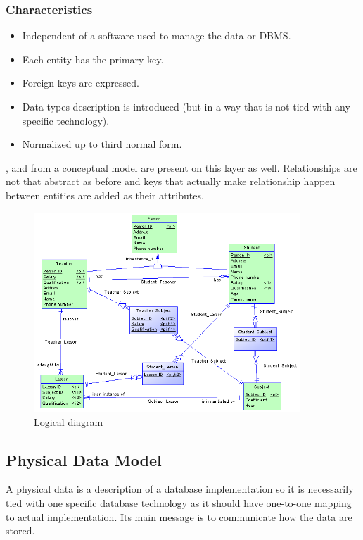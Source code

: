 \subsubsection{Characteristics}
\begin{itemize}
	\item Independent of a software used to manage the data or DBMS.
	\item Each entity has the primary key.
	\item Foreign keys are expressed.
	\item Data types description is introduced (but in a way that is not tied with any specific technology).
	\item Normalized up to third normal form.
\end{itemize}
,  and  from a conceptual model are present on this layer as well. Relationships are not that abstract as before and keys that actually make relationship happen between entities are added as their attributes.

\begin{figure}[H]
	\centering
	\includegraphics[width=10cm]{../img/Logical_Model_PowerDesigner}
	\caption{Logical diagram\cite{PowerDesignerDocumentation}}
\end{figure}

\subsection{Physical Data Model}

A physical data is a description of a database implementation so it is necessarily tied with one specific database technology as it should have one-to-one mapping to actual implementation. Its main message is to communicate how the data are stored.

